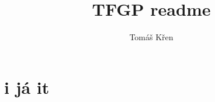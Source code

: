 \documentclass[a4paper,oneside]{memoir}
\title{TFGP readme}
\author{Tomáš Křen}
\begin{document}
\theoremstyle{plain} 
\newtheorem{theorem}{Theorem} 
\newtheorem{proposition}{Proposition} 
\newtheorem{lemma}{Lemma} 
\newtheorem{preLemma}{Pre-Lemma} 
\newtheorem*{corollary}{Corollary}

\theoremstyle{definition} 
\newtheorem*{definition}{Definition} 
\newtheorem*{preDefinition}{Pre-Definition} 
\newtheorem{conjecture}{Conjecture}
\newtheorem*{example}{Example} 

\theoremstyle{remark} 
\newtheorem*{remark}{Remark} 
\newtheorem*{note}{Note} 
\newtheorem{case}{Case}

\frontmatter
\mainmatter
\maketitle


\tableofcontents*

\newcommand{\red}[1]{{\color{red} #1}}



\newcommand{\sigmaPr}{\sigma^\prime}
\newcommand{\tauPr}{\tau^\prime}
\newcommand{\xPr}{x^\prime}
\newcommand{\nPr}{n^\prime}
\newcommand{\nPrr}{n^{\prime\prime}}
\newcommand{\nPrrr}{n^{\prime\prime\prime}}
\newcommand{\tausPr}{\tau_s^\prime}
\newcommand{\s}{\sigma}
\newcommand{\Th}{\theta}
\newcommand{\sPr}{\sigmaPr}
\newcommand{\thPr}{\theta^\prime}



\newcommand{\then}{\Rightarrow}
\newcommand{\E}[2]{(\exists #1)\ #2}
\newcommand{\A}[2]{(\forall #1)\ #2}
\newcommand{\Ain}[3]{(\forall #1 \in #2)\ #3}


\newcommand{\op}{\operatorname}

\newcommand{\ar}{\rightarrow}
\newcommand{\ap}[2]{(#1\,#2)}
\newcommand{\defi}{\coloneqq}
\newcommand{\defe}{\mathrel{\vcentcolon\equiv}}

\newcommand{\binRule}[3]{\dfrac{#1\ ,\ #2}{#3}}
\newcommand{\triRule}[4]{\dfrac{#1\ ,\ #2\ , \ #3}{#4}}
\newcommand{\isSub}[1]{#1\ \mathit{substitution}}
\newcommand{\MGU}[2]{\op{MGU}(#1,#2)}
\newcommand{\mgu}[1]{\op{MGU}(#1)}

\newcommand{\AX}{\textit{AX}\xspace}
\newcommand{\subAx}{\textit{SUB-AX}\xspace}
\newcommand{\mguMp}{\textit{MGU-MP}\xspace}
\newcommand{\abs}[1]{\lvert #1 \rvert}




\chapter{i já it}
\end{document}
